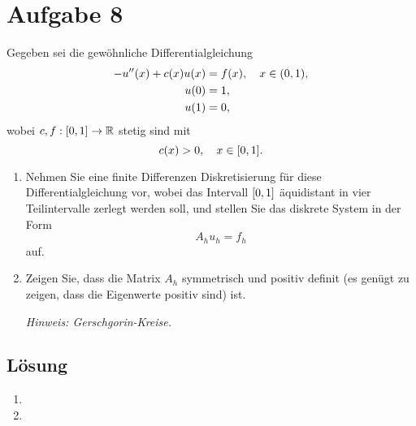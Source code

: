 \documentclass{exercise}
\begin{document}
    \section*{Aufgabe 8}
    
    \begin{problem}
        Gegeben sei die gewöhnliche Differentialgleichung
        \begin{align*}
            -u''\parentheses*{x} + c\parentheses*{x}u\parentheses*{x} &= f\parentheses*{x}, \quad x \in \parentheses*{0, 1},\\
            u\parentheses*{0} &= 1,\\
            u\parentheses*{1} &= 0,
        \end{align*}
        wobei \(c, f: \brackets*{0, 1} \to \R\) stetig sind mit
        \[
            c\parentheses*{x} > 0, \quad x \in \brackets*{0, 1}.
        \]
        \begin{enumerate}
            \item Nehmen Sie eine finite Differenzen Diskretisierung für diese Differentialgleichung vor, wobei das Intervall \(\brackets*{0, 1}\) äquidistant in vier Teilintervalle zerlegt werden soll, und stellen Sie das diskrete System in der Form
            \[
                A_h u_h = f_h
            \]
            auf.
            \item Zeigen Sie, dass die Matrix \(A_h\) symmetrisch und positiv definit (es genügt zu zeigen, dass die Eigenwerte positiv sind) ist.

            \emph{Hinweis: Gerschgorin-Kreise.}
        \end{enumerate}
    \end{problem}
    
    \subsection*{Lösung}
    \begin{enumerate}
        \item
        \item
    \end{enumerate}
\end{document}
